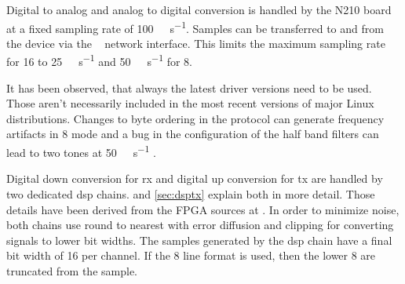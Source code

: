 \documentclass[12pt,a4paper,parskip=full]{scrartcl}
\begin{document}
Digital to analog and analog to digital conversion is handled by the N210 board at a fixed sampling rate of
\SI{100}{\mega\samples\per\second}. Samples can be transferred to and from the device via the
\si{\giga\bit} network interface. This limits the maximum sampling rate for \SI{16}{\bit} to
\SI{25}{\mega\samples\per\second} and \SI{50}{\mega\samples\per\second} for \SI{8}{\bit}.

It has been observed, that always the latest driver versions need to be used. Those aren't
necessarily included in the most recent versions of major Linux distributions. Changes to
byte ordering in the protocol \cite{usrp_byte} can
generate frequency artifacts in \SI{8}{\bit} mode and a bug in the configuration of the half
band filters can lead to two tones at \SI{50}{\mega\samples\per\second} \cite{usrp_hb}.

Digital down conversion for \gls{rx} and digital up conversion for \gls{tx} are handled
by two dedicated \gls{dsp} chains.
 and \cref{sec:dsptx} explain both in more detail. Those details have been derived
from the FPGA sources at \cite{usrp_src}.
In order to minimize noise, both chains use round to nearest with error diffusion and clipping
for converting signals to lower bit widths. The samples generated by the dsp chain have a final
bit width of \SI{16}{\bit} per channel. If the \SI{8}{\bit} line format is used, then the
lower \SI{8}{\bit} are truncated from the sample.
\end{document}
